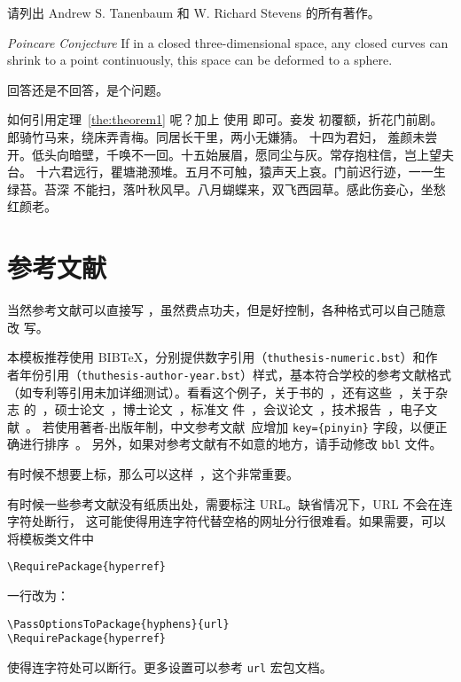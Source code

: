 \begin{exercise}
  请列出 Andrew S. Tanenbaum 和 W. Richard Stevens 的所有著作。
\end{exercise}

\begin{conjecture} \textit{Poincare Conjecture} If in a closed three-dimensional
  space, any closed curves can shrink to a point continuously, this space can be
  deformed to a sphere.
\end{conjecture}

\begin{problem}
 回答还是不回答，是个问题。
\end{problem}

如何引用定理~\ref{the:theorem1} 呢？加上  使用  即可。妾发
初覆额，折花门前剧。郎骑竹马来，绕床弄青梅。同居长干里，两小无嫌猜。 十四为君妇，
羞颜未尝开。低头向暗壁，千唤不一回。十五始展眉，愿同尘与灰。常存抱柱信，岂上望夫
台。 十六君远行，瞿塘滟滪堆。五月不可触，猿声天上哀。门前迟行迹，一一生绿苔。苔深
不能扫，落叶秋风早。八月蝴蝶来，双飞西园草。感此伤妾心，坐愁红颜老。

\section{参考文献}
\label{sec:bib}
当然参考文献可以直接写 ，虽然费点功夫，但是好控制，各种格式可以自己随意改
写。

本模板推荐使用 BIB\TeX，分别提供数字引用（\texttt{thuthesis-numeric.bst}）和作
者年份引用（\texttt{thuthesis-author-year.bst}）样式，基本符合学校的参考文献格式
（如专利等引用未加详细测试）。看看这个例子，关于书的~\cite{tex, companion,
  ColdSources}，还有这些~\cite{Krasnogor2004e, clzs, zjsw}，关于杂志
的~\cite{ELIDRISSI94, MELLINGER96, SHELL02}，硕士论文~\cite{zhubajie,
  metamori2004}，博士论文~\cite{shaheshang, FistSystem01}，标准文
件~\cite{IEEE-1363}，会议论文~\cite{DPMG,kocher99}，技术报告~\cite{NPB2}，电子文
献~\cite{chuban2001,oclc2000}。
若使用著者-出版年制，中文参考文献~\cite{cnarticle}应增加
\texttt{key=\{pinyin\}} 字段，以便正确进行排序~\cite{cnproceed}。
另外，如果对参考文献有不如意的地方，请手动修改 \texttt{bbl} 文件。

有时候不想要上标，那么可以这样~，这个非常重要。

有时候一些参考文献没有纸质出处，需要标注 URL。缺省情况下，URL 不会在连字符处断行，
这可能使得用连字符代替空格的网址分行很难看。如果需要，可以将模板类文件中
\begin{verbatim}
\RequirePackage{hyperref}
\end{verbatim}
一行改为：
\begin{verbatim}
\PassOptionsToPackage{hyphens}{url}
\RequirePackage{hyperref}
\end{verbatim}
使得连字符处可以断行。更多设置可以参考 \texttt{url} 宏包文档。

